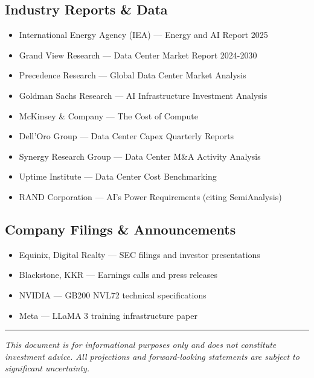 \documentclass[11pt,a4paper]{article}
\begin{document}
\subsection*{Industry Reports \& Data}
\begin{itemize}[leftmargin=*, itemsep=3pt]
    \item International Energy Agency (IEA) — Energy and AI Report 2025
    \item Grand View Research — Data Center Market Report 2024-2030
    \item Precedence Research — Global Data Center Market Analysis
    \item Goldman Sachs Research — AI Infrastructure Investment Analysis
    \item McKinsey \& Company — The Cost of Compute
    \item Dell'Oro Group — Data Center Capex Quarterly Reports
    \item Synergy Research Group — Data Center M\&A Activity Analysis
    \item Uptime Institute — Data Center Cost Benchmarking
    \item RAND Corporation — AI's Power Requirements (citing SemiAnalysis)
\end{itemize}

\subsection*{Company Filings \& Announcements}
\begin{itemize}[leftmargin=*, itemsep=3pt]
    \item Equinix, Digital Realty — SEC filings and investor presentations
    \item Blackstone, KKR — Earnings calls and press releases
    \item NVIDIA — GB200 NVL72 technical specifications
    \item Meta — LLaMA 3 training infrastructure paper
\end{itemize}

\vspace{1cm}

\begin{center}
\rule{0.5\textwidth}{0.4pt}
\end{center}

\vspace{0.5cm}

\begin{center}
\textit{\small This document is for informational purposes only and does not constitute investment advice. All projections and forward-looking statements are subject to significant uncertainty.}
\end{center}
\end{document}
